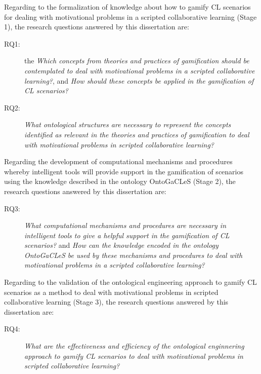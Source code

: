 Regarding to the formalization of knowledge about how to gamify CL scenarios for dealing with motivational problems in a scripted collaborative learning (Stage 1), the research questions answered by this dissertation are:

\begin{description}
\item[RQ1:]the
\emph{Which concepts from theories and practices of gamification should be contemplated to deal with motivational problems in a scripted collaborative learning?}, and
\emph{How should these concepts be applied in the gamification of CL scenarios?}

\item[RQ2:]
\emph{What ontological structures are necessary to represent the concepts identified as relevant in the theories and practices of gamification to deal with motivational problems in scripted collaborative learning?}

\end{description}

Regarding the development of computational mechanisms and procedures whereby intelligent tools will provide support in the gamification of scenarios using the knowledge described in the ontology OntoGaCLeS (Stage 2), the research questions answered by this dissertation are:

\begin{description}
\item[RQ3:]
\emph{What computational mechanisms and procedures are necessary in intelligent tools to give a helpful support in the gamification of CL scenarios?} and
\emph{How can the knowledge encoded in the ontology OntoGaCLeS be used by these mechanisms and procedures to deal with motivational problems in a scripted collaborative learning?}
\end{description}

Regarding to the validation of the ontological engineering approach to gamify CL scenarios as a method to deal with motivational problems in scripted collaborative learning (Stage 3), the research questions answered by this dissertation are:

\begin{description}
\item[RQ4:]
\emph{What are the effectiveness and efficiency of the ontological enginnering approach to gamify CL scenarios to deal with motivational problems in scripted collaborative learning?}
\end{description}

